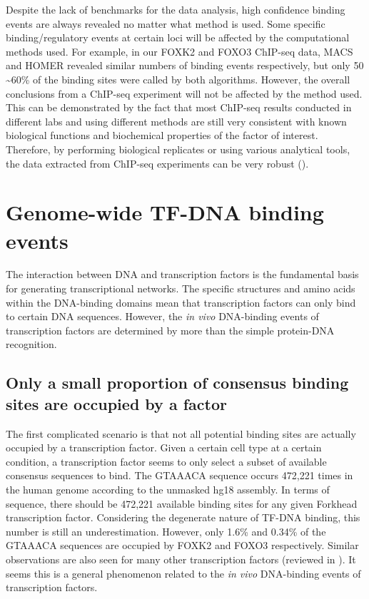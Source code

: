 Despite the lack of benchmarks for the data analysis, high confidence binding events are always revealed no matter what method is used. Some specific binding/regulatory events at certain loci will be affected by the computational methods used. For example, in our FOXK2 and FOXO3 ChIP-seq data, MACS and HOMER revealed similar numbers of binding events respectively, but only 50 \textasciitilde 60\% of the binding sites were called by both algorithms. However, the overall conclusions from a ChIP-seq experiment will not be affected by the method used. This can be demonstrated by the fact that most ChIP-seq results conducted in different labs and using different methods are still very consistent with known biological functions and biochemical properties of the factor of interest. Therefore, by performing biological replicates or using various analytical tools, the data extracted from ChIP-seq experiments can be very robust (\cite{wilbanks2010evaluation}).

\section{Genome-wide TF-DNA binding events}

The interaction between DNA and transcription factors is the fundamental basis for generating transcriptional networks. The specific structures and amino acids within the DNA-binding domains mean that transcription factors can only bind to certain DNA sequences. However, the \textit{in vivo} DNA-binding events of transcription factors are determined by more than the simple protein-DNA recognition.

\subsection{Only a small proportion of consensus binding sites are occupied by a factor}

The first complicated scenario is that not all potential binding sites are actually occupied by a transcription factor. Given a certain cell type at a certain condition, a transcription factor seems to only select a subset of available consensus sequences to bind. The GTAAACA sequence occurs 472,221 times in the human genome according to the unmasked hg18 assembly. In terms of sequence, there should be 472,221 available binding sites for any given Forkhead transcription factor. Considering the degenerate nature of TF-DNA binding, this number is still an underestimation. However, only 1.6\% and 0.34\% of the GTAAACA sequences are occupied by FOXK2 and FOXO3 respectively. Similar observations are also seen for many other transcription factors (reviewed in \cite{pan2010mechanisms}). It seems this is a general phenomenon related to the \textit{in vivo} DNA-binding events of transcription factors.

